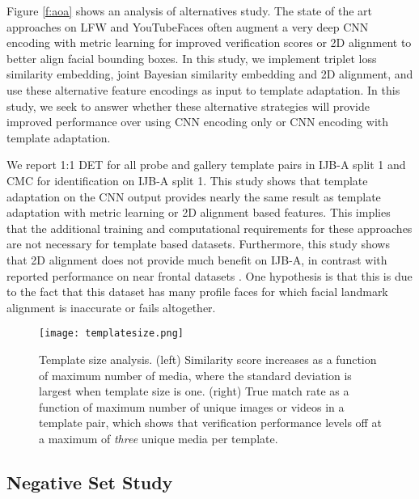 \documentclass[10pt,twocolumn,letterpaper]{article}
\theoremstyle{definition}		\newtheorem{defn}[thm]{Definition}
\newcommand{\figwidth}{6.85in}
\newcommand{\ARXIV}{}
\begin{document}
Figure \ref{f:aoa} shows an analysis of alternatives study.  The state of the art approaches on LFW and YouTubeFaces often augment a very deep CNN encoding with metric learning \cite{Schroff15,Parkhi15} for improved verification scores or 2D alignment \cite{Taigman14,Parkhi15} to better align facial bounding boxes.  In this study, we implement triplet loss similarity embedding, joint Bayesian similarity embedding and 2D alignment, and use these alternative feature encodings as input to template adaptation.  In this study, we seek to answer whether these alternative strategies will provide improved performance over using CNN encoding only or CNN encoding with template adaptation.

We report 1:1 DET for all probe and gallery  template pairs in IJB-A split 1 and CMC for identification on IJB-A split 1.  This study shows that template adaptation on the CNN output provides nearly the same result as template adaptation with metric learning or 2D alignment based features.  This implies that the additional training and computational requirements for these approaches are not necessary for template based datasets.  Furthermore, this study shows that 2D alignment does not provide much benefit on IJB-A, in contrast with reported performance on near frontal datasets \cite{Parkhi15,Taigman14}.  One hypothesis is that this is due to the fact that this dataset has many profile faces for which facial landmark alignment is inaccurate or fails altogether.     





\ifdefined\ARXIV
\begin{figure*}[t]
\begin{centering}
\texttt{[image: templatesize.png]} 
\caption{Template size analysis. (left) Similarity score increases as a function of maximum number of media, where the standard deviation is largest when template size is one. (right) True match rate as a function of maximum number of unique images or videos in a template pair, which shows that verification performance levels off at a maximum of {\em three} unique media per template.}
\label{f:template}
\end{centering}
\end{figure*}

 \fi


\subsection{Negative Set Study}
\label{ss:negativeset}
\end{document}
